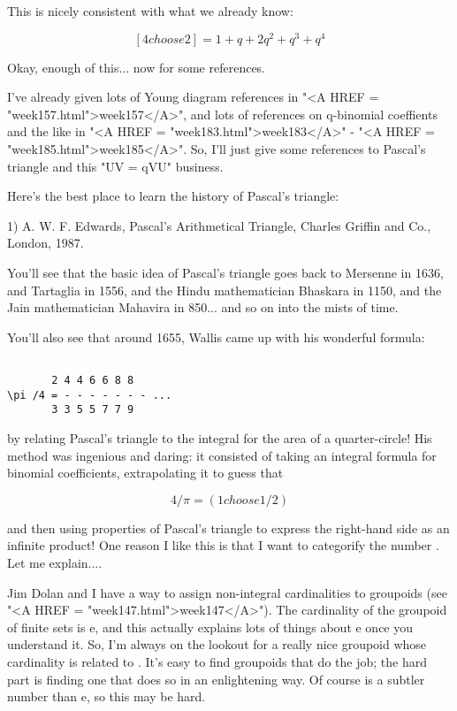 This is nicely consistent with what we already know:


$$

[4 choose 2] = 1 + q + 2q^{2} + q^{3} + q^{4}
$$
    
Okay, enough of this... now for some references.  

I've already given lots of Young diagram references in "<A HREF =
"week157.html">week157</A>", and lots of references on q-binomial
coeffients and the like in "<A HREF =
"week183.html">week183</A>" - "<A HREF =
"week185.html">week185</A>".  So, I'll just give some references to
Pascal's triangle and this "UV = qVU" business.

Here's the best place to learn the history of Pascal's triangle:

1) A. W. F. Edwards, Pascal's Arithmetical Triangle, Charles Griffin
and Co., London, 1987.

You'll see that the basic idea of Pascal's triangle goes back to
Mersenne in 1636, and Tartaglia in 1556, and the Hindu mathematician
Bhaskara in 1150, and the Jain mathematician Mahavira in 850... and
so on into the mists of time.  

You'll also see that around 1655, Wallis came up with his wonderful
formula:


\begin{verbatim}

       2 4 4 6 6 8 8 
\pi /4 = - - - - - - - ...
       3 3 5 5 7 7 9 
\end{verbatim}
    
by relating Pascal's triangle to the integral for the area of a 
quarter-circle!  His method was ingenious and daring: it consisted
of taking an integral formula for binomial coefficients, extrapolating 
it to guess that


$$

4/\pi  = (1 choose 1/2)
$$
    
and then using properties of Pascal's triangle to express the right-hand
side as an infinite product!  One reason I like this is that I want
to categorify the number \pi .  Let me explain....

Jim Dolan and I have a way to assign non-integral cardinalities to
groupoids (see "<A HREF = "week147.html">week147</A>").  The
cardinality of the groupoid of finite sets is e, and this actually
explains lots of things about e once you understand it.  So, I'm always
on the lookout for a really nice groupoid whose cardinality is related
to \pi .  It's easy to find groupoids that do the job; the hard part is
finding one that does so in an enlightening way.  Of course \pi  is a
subtler number than e, so this may be hard.

